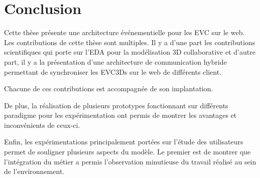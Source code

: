 \chapter{Conclusion}
\chaptertable

Cette thèse présente une architecture événementielle pour les \gls{EVC} sur le 
web. Les contributions de cette thèse sont multiples. Il y a d'une part les 
contributions scientifiques qui porte sur l'\gls{EDA} pour la 
modélisation 3D collaborative et d'autre part, il y a la présentation d'une 
architecture de communication hybride permettant de synchroniser les 
\glspl{EVC3D} sur le web de différents client.

Chacune de ces contributions est accompagnée de son implantation. 

De plus, la réalisation de plusieurs prototypes fonctionnant sur différents 
paradigme pour les expérimentation ont permis de montrer les avantages et 
inconvénients de ceux-ci.

Enfin, les expérimentations principalement portées sur l'étude des utilisateurs 
permet de souligner plusieurs aspects du modèle. Le premier est de montrer que 
l'intégration du métier a permis l'observation minutieuse du travail réalisé au sein 
de l'environnement. 